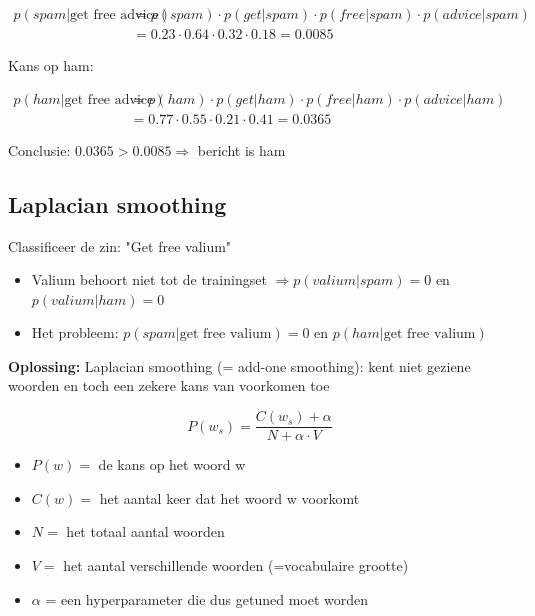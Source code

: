 \documentclass{article}
\begin{document}
\begin{align*}
    p(spam | \text{get free advice}) & = p(spam) \cdot p(get|spam) \cdot p(free|spam) \cdot p(advice | spam)\\
    & = 0.23 \cdot 0.64 \cdot 0.32 \cdot 0.18 = 0.0085
\end{align*}

Kans op ham:

\begin{align*}
    p(ham | \text{get free advice}) & = p(ham) \cdot p(get|ham) \cdot p(free|ham) \cdot p(advice | ham)\\
    & = 0.77 \cdot 0.55 \cdot 0.21 \cdot 0.41 = 0.0365
\end{align*}

Conclusie: $0.0365 > 0.0085 \Rightarrow$ bericht is ham

\subsection{Laplacian smoothing}

Classificeer de zin: "Get free valium"

\begin{itemize}
    \item Valium behoort niet tot de trainingset $\Rightarrow p(valium | spam) = 0$ en $p(valium | ham) = 0$
    \item Het probleem: $p(spam | \text{get free valium}) = 0$ en $p(ham | \text{get free valium})$
\end{itemize}

\textbf{Oplossing:} Laplacian smoothing (= add-one smoothing): kent niet geziene woorden en toch een zekere kans van voorkomen toe

\begin{equation}
    P(w_s) = \frac{C(w_s) + \alpha}{N + \alpha \cdot V}
\end{equation}

\begin{itemize}
    \item $P(w) =$ de kans op het woord w
    \item $C(w) =$ het aantal keer dat het woord w voorkomt
    \item $N =$ het totaal aantal woorden
    \item $V =$ het aantal verschillende woorden (=vocabulaire grootte)
    \item $\alpha$ = een hyperparameter die dus getuned moet worden
\end{itemize}
\end{document}
